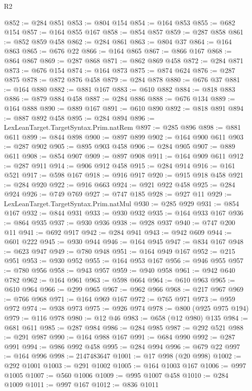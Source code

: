 \begin{lexlean}{R2}
\begin{coremodule}
@852 := @284 @851
@853 := @804 @154
@854 := @164 @853
@855 := @682 @154
@857 := @164 @855 @167
@858 := @854 @857
@859 := @287 @858
@861 := @852 @859 @458
@862 := @284 @861
@863 := @804 @37
@864 := @164 @863
@865 := @676 @22
@866 := @164 @865
@867 := @866 @167
@868 := @864 @867
@869 := @287 @868
@871 := @862 @869 @458
@872 := @284 @871
@873 := @676 @154
@874 := @164 @873
@875 := @874 @624
@876 := @287 @875
@878 := @872 @876 @458
@879 := @284 @878
@880 := @676 @37
@881 := @164 @880
@882 := @881 @167
@883 := @610 @882
@884 := @818 @883
@886 := @879 @884 @458
@887 := @284 @886
@888 := @676 @134
@889 := @164 @888
@890 := @889 @167
@891 := @610 @890
@892 := @818 @891
@894 := @887 @892 @458
@895 := @284 @894
@896 := LexLeanTarget.TargetSyntax.Prim.natRem
@897 := @285 @896
@898 := @881 @611
@899 := @844 @898
@900 := @897 @899
@902 := @164 @900 @611
@903 := @287 @902
@905 := @895 @903 @458
@906 := @284 @905
@907 := @889 @611
@908 := @854 @907
@909 := @897 @908
@911 := @164 @909 @611
@912 := @287 @911
@914 := @906 @912 @458
@915 := @284 @914
@916 := @161 @521
@917 := @598 @167
@918 := @916 @917
@920 := @915 @918 @458
@921 := @284 @920
@922 := @916 @663
@924 := @921 @922 @458
@925 := @284 @924
@926 := @749 @769
@927 := @747 @185
@928 := @927 @11
@929 := LexLeanTarget.TargetSyntax.Prim.natMul
@930 := @285 @929
@931 := @854 @167
@932 := @844 @931
@933 := @930 @932
@935 := @164 @933 @167
@936 := @864 @935
@937 := @930 @936
@938 := @928 @937
@940 := @747 @200 @11
@941 := @692 @917
@942 := @284 @941
@943 := @942 @609
@944 := @601 @222
@945 := @930 @944
@946 := @164 @945
@947 := @834 @167
@948 := @623 @947
@949 := @780 @948
@951 := @164 @949 @167
@952 := @215 @951
@953 := @930 @952
@955 := @164 @953 @167
@956 := @946 @955
@957 := @780 @956
@958 := @943 @957
@959 := @940 @958
@961 := @942 @640 @782
@962 := @164 @961
@963 := @598 @664
@964 := @610 @963
@965 := @610 @964
@966 := @299 @965
@967 := @962 @966
@968 := @217 @967
@969 := @766 @968
@971 := @164 @969 @167
@972 := @765 @971
@973 := @959 @972
@974 := @938 @973
@975 := @926 @974
@978 := @800 (@925 @975 @194)
@979 := @116 @978
@980 := @12 @46
@983 := @658 (@12 @980) @135
@984 := @681 @611
@985 := @287 @984
@986 := @284 @985
@987 := @292 @521
@988 := @291 @987
@990 := @164 @988 @167
@991 := @684 @990
@992 := @287 @991
@994 := @986 @992 @458
@995 := @284 @994
@996 := @679 @22
@997 := @164 @996
@998 := 2147483647
@1001 := @17 @998 (@20 @998)
@1002 := @292 @1001
@1003 := @291 @1002
@1005 := @164 @1003 @167
@1006 := @997 @1005
@1007 := @560 @1006
@1009 := @995 @1007 @458
@1010 := @284 @1009
@1011 := @997 @167
@1012 := @836 @1011

\end{coremodule}
\end{lexlean}
